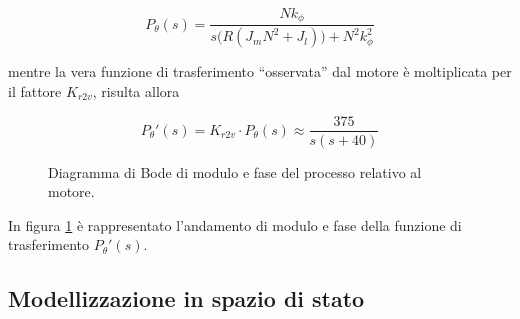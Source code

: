 		\begin{equation}
			P_{\theta}(s) = 
			\frac{Nk_{\phi}}{s\bigl( R(J_mN^2+J_l) \bigl) + N^2k_{\phi}^2}
			\label{eq:FunzioneTrasferimentoComplessiva}
		\end{equation}
		
		\noindent mentre la vera funzione di trasferimento ``osservata'' dal motore è moltiplicata per il fattore $K_{r2v}$, risulta allora
		
		\begin{equation*}
			P_{\theta}'(s)= K_{r2v}\cdot P_{\theta}(s) \approx \frac{375}{s(s+40)}
		\end{equation*}
		
		\begin{figure}[H]
			\centering
			\label{subfig:diagrammaBode} \quad
			\label{subfig:mappaZeriPoli}
			\caption{Diagramma di Bode di modulo e fase del processo relativo al motore.}
			\label{fig:diagrammiMotore}
		\end{figure}	
		
		\noindent In figura \ref{fig:diagrammiMotore} è rappresentato l'andamento di modulo e fase della funzione di trasferimento $P_{\theta}'(s)$.
		
	\subsection{Modellizzazione in spazio di stato}
	\label{subsec:ModelloStato}
	
